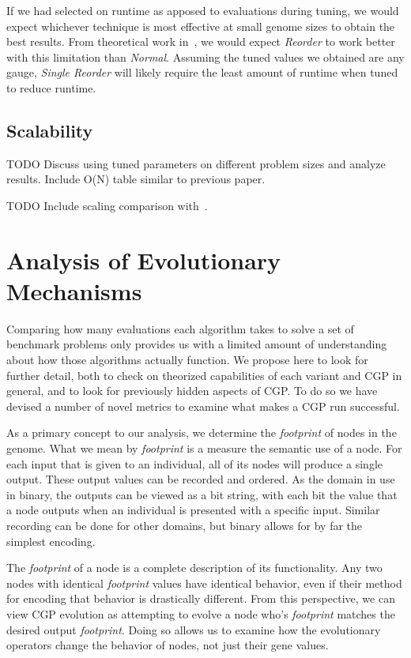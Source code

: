 \documentclass[journal]{IEEEtran}
\begin{document}
If we had selected on runtime as apposed to evaluations during tuning, we would expect whichever
technique is most effective at small genome sizes to obtain the best results.
From theoretical work in~\cite{goldman:2013:ordering}, we would expect \emph{Reorder}
to work better with this limitation than \emph{Normal}.  Assuming the tuned values
we obtained are any gauge, \emph{Single Reorder} will likely require the least
amount of runtime when tuned to reduce runtime.

\subsection{Scalability}
TODO Discuss using tuned parameters on different problem sizes and analyze
results.  Include O(N) table similar to previous paper.

TODO Include scaling comparison with~\cite{walker:2008:cgpmodules}.

\section{Analysis of Evolutionary Mechanisms}
\label{sec:analysis}
Comparing how many evaluations each algorithm takes to solve a set of benchmark
problems only provides us with a limited amount of understanding about how
those algorithms actually function.  We propose here to look for further detail,
both to check on theorized capabilities of each variant and CGP in general, and
to look for previously hidden aspects of CGP.
To do so we have devised a number of novel metrics to examine what makes a
CGP run successful.

As a primary concept to our analysis, we determine the \emph{footprint} of nodes
in the genome.  What we mean by \emph{footprint} is a measure the semantic use
of a node.  For each input that is given to an individual, all of its nodes
will produce a single output.  These output values can be recorded and ordered.
As the domain in use in binary, the outputs can be viewed as a bit string, with
each bit the value that a node outputs when an individual is presented with a
specific input.  Similar recording can be done for other domains, but binary
allows for by far the simplest encoding.

The \emph{footprint} of a node is a complete description of its functionality.
Any two nodes with identical \emph{footprint} values have identical behavior,
even if their method for encoding that behavior is drastically different.  From
this perspective, we can view CGP evolution as attempting to evolve a node who's
\emph{footprint} matches the desired output \emph{footprint}.  Doing so allows
us to examine how the evolutionary operators change the behavior of nodes,
not just their gene values.
\end{document}
